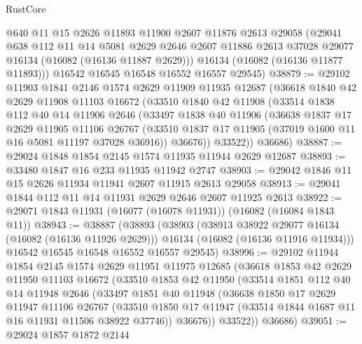 \begin{lexlean}{RustCore}
\begin{coremodule}
        @640
        @11
        @15
        @2626
        @11893
        @11900
        @2607
        @11876
        @2613
        @29058
        (@29041
          @638
          @112
          @11
          @14
          @5081
          @2629
          @2646
          @2607
          @11886
          @2613
          @37028
          @29077
          @16134
          (@16082 (@16136 @11887 @2629)))
        @16134
        (@16082 (@16136 @11877 @11893)))
      @16542
      @16545
      @16548
      @16552
      @16557
      @29545)
@38879 := @29102
    @11903
    @1841
    @2146
    @1574
    @2629
    @11909
    @11935
    @12687
    (@36618
      @1840
      @42
      @2629
      @11908
      @11103
      @16672
      (@33510
        @1840
        @42
        @11908
        (@33514
          @1838
          @112
          @40
          @14
          @11906
          @2646
          (@33497
            @1838
            @40
            @11906
            (@36638
              @1837
              @17
              @2629
              @11905
              @11106
              @26767
              (@33510 @1837 @17 @11905 (@37019 @1600 @11 @16 @5081 @11197 @37028 @36916))
              @36676))
          @33522))
      @36686)
@38887 := @29024 @1848 @1854 @2145 @1574 @11935 @11944 @2629 @12687
@38893 := @33480 @1847 @16 @233 @11935 @11942 @2747
@38903 := @29042 @1846 @11 @15 @2626 @11934 @11941 @2607 @11915 @2613 @29058
@38913 := @29041 @1844 @112 @11 @14 @11931 @2629 @2646 @2607 @11925 @2613
@38922 := @29071 @1843 @11931 (@16077 (@16078 @11931)) (@16082 (@16084 @1843 @11))
@38943 := @38887
    (@38893
      (@38903
        (@38913 @38922 @29077 @16134 (@16082 (@16136 @11926 @2629)))
        @16134
        (@16082 (@16136 @11916 @11934)))
      @16542
      @16545
      @16548
      @16552
      @16557
      @29545)
@38996 := @29102
    @11944
    @1854
    @2145
    @1574
    @2629
    @11951
    @11975
    @12685
    (@36618
      @1853
      @42
      @2629
      @11950
      @11103
      @16672
      (@33510
        @1853
        @42
        @11950
        (@33514
          @1851
          @112
          @40
          @14
          @11948
          @2646
          (@33497
            @1851
            @40
            @11948
            (@36638
              @1850
              @17
              @2629
              @11947
              @11106
              @26767
              (@33510 @1850 @17 @11947 (@33514 @1844 @1687 @11 @16 @11931 @11506 @38922 @37746))
              @36676))
          @33522))
      @36686)
@39051 := @29024
    @1857
    @1872
    @2144

\end{coremodule}
\end{lexlean}
